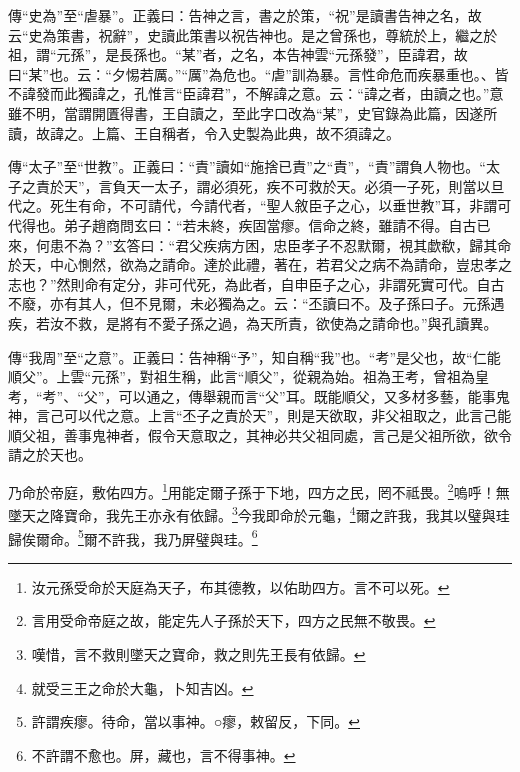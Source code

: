 {\noindent\zhuan{}\fzbyks 傳“史為”至“虐暴”。正義曰：告神之言，書之於策，“祝”是讀書告神之名，故云“史為策書，祝辭”，史讀此策書以祝告神也。是之曾孫也，尊統於上，繼之於祖，謂“元孫”，是長孫也。“某”者，之名，本告神雲“元孫發”，臣諱君，故曰“某”也。云：“夕惕若厲。”“厲”為危也。“虐”訓為暴。言性命危而疾暴重也。、皆不諱發而此獨諱之，孔惟言“臣諱君”，不解諱之意。云：“諱之者，由讀之也。”意雖不明，當謂開匱得書，王自讀之，至此字口改為“某”，史官錄為此篇，因遂所讀，故諱之。上篇、王自稱者，令入史製為此典，故不須諱之。 \par}

{\noindent\zhuan{}\fzbyks 傳“太子”至“世教”。正義曰：“責”讀如“施捨已責”之“責”，“責”謂負人物也。“太子之責於天”，言負天一太子，謂必須死，疾不可救於天。必須一子死，則當以旦代之。死生有命，不可請代，今請代者，“聖人敘臣子之心，以垂世教”耳，非謂可代得也。弟子趙商問玄曰：“若未終，疾固當瘳。信命之終，雖請不得。自古已來，何患不為？”玄答曰：“君父疾病方困，忠臣孝子不忍默爾，視其歔欷，歸其命於天，中心惻然，欲為之請命。達於此禮，著在，若君父之病不為請命，豈忠孝之志也？”然則命有定分，非可代死，為此者，自申臣子之心，非謂死實可代。自古不廢，亦有其人，但不見爾，未必獨為之。云：“丕讀曰不。及子孫曰子。元孫遇疾，若汝不救，是將有不愛子孫之過，為天所責，欲使為之請命也。”與孔讀異。 \par}

{\noindent\zhuan{}\fzbyks 傳“我周”至“之意”。正義曰：告神稱“予”，知自稱“我”也。“考”是父也，故“仁能順父”。上雲“元孫”，對祖生稱，此言“順父”，從親為始。祖為王考，曾祖為皇考，“考”、“父”，可以通之，傳舉親而言“父”耳。既能順父，又多材多藝，能事鬼神，言己可以代之意。上言“丕子之責於天”，則是天欲取，非父祖取之，此言己能順父祖，善事鬼神者，假令天意取之，其神必共父祖同處，言己是父祖所欲，欲令請之於天也。 \par}

乃命於帝庭，敷佑四方。\footnote{汝元孫受命於天庭為天子，布其德教，以佑助四方。言不可以死。}用能定爾子孫于下地，四方之民，罔不祗畏。\footnote{言用受命帝庭之故，能定先人子孫於天下，四方之民無不敬畏。}嗚呼！無墜天之降寶命，我先王亦永有依歸。\footnote{嘆惜，言不救則墜天之寶命，救之則先王長有依歸。}今我即命於元龜，\footnote{就受三王之命於大龜，卜知吉凶。}爾之許我，我其以璧與珪歸俟爾命。\footnote{許謂疾瘳。待命，當以事神。○瘳，敕留反，下同。}爾不許我，我乃屏璧與珪。\footnote{不許謂不愈也。屏，藏也，言不得事神。}

